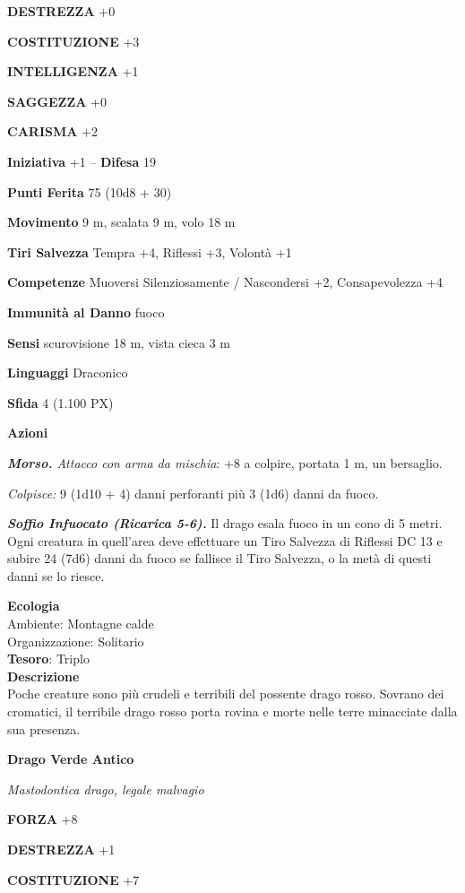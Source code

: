 \begin{multicols}{2}
\textbf{DESTREZZA} +0

\textbf{COSTITUZIONE} +3

\textbf{INTELLIGENZA} +1

\textbf{SAGGEZZA} +0

\textbf{CARISMA} +2

\textbf{Iniziativa} +1 -- \textbf{Difesa} 19

\textbf{Punti Ferita} 75 (10d8 + 30)

\textbf{Movimento} 9 m, scalata 9 m, volo 18 m

\textbf{Tiri Salvezza} Tempra +4, Riflessi +3, Volontà +1

\textbf{Competenze} Muoversi Silenziosamente / Nascondersi +2, Consapevolezza +4

\textbf{Immunità al Danno} fuoco

\textbf{Sensi} scurovisione 18 m, vista cieca 3 m

\textbf{Linguaggi} Draconico

\textbf{Sfida} 4 (1.100 PX)

\textbf{Azioni}

\textit{\textbf{Morso.} Attacco con arma da mischia}: +8 a colpire, portata 1 m, un bersaglio.

\textit{Colpisce:} 9 (1d10 + 4) danni perforanti più 3 (1d6) danni da fuoco.

\textit{\textbf{Soffio Infuocato (Ricarica 5-6).}} Il drago esala fuoco in un cono di 5 metri. Ogni creatura in quell'area deve effettuare un Tiro Salvezza di Riflessi DC 13 e subire 24 (7d6) danni da fuoco se fallisce il Tiro Salvezza, o la metà di questi danni se lo riesce.

\textbf{Ecologia}\\
Ambiente: Montagne calde\\
Organizzazione: Solitario\\
\textbf{Tesoro}: Triplo\\
\textbf{Descrizione}\\
Poche creature sono più crudeli e terribili del possente drago rosso. Sovrano dei cromatici, il terribile drago rosso porta rovina e morte nelle terre minacciate dalla sua presenza.


\medskip{}\textbf{Drago Verde Antico}

\textit{Mastodontica drago, legale malvagio}

\textbf{FORZA} +8

\textbf{DESTREZZA} +1

\textbf{COSTITUZIONE} +7


\end{multicols}
